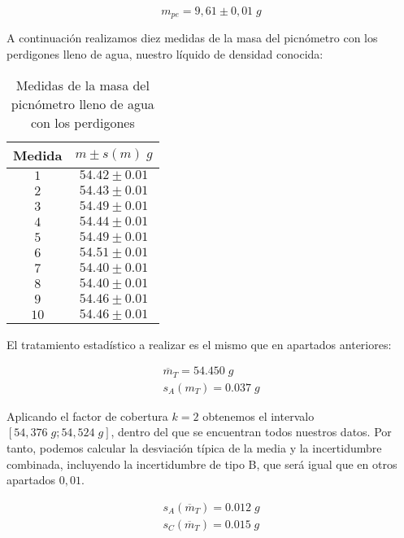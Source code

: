 \documentclass[a4paper,12pt,titlepage]{article}
\begin{document}
\begin{equation}
    m_{pe} = 9,61 \pm 0,01 \; g
\end{equation}

A continuación realizamos diez medidas de la masa del picnómetro con los perdigones lleno de agua, nuestro líquido de densidad conocida:

\begin{table}[h!]
    \centering
    \begin{tabular}{|c|c|}
    \hline
    Medida & $m \pm s(m) \; g$ \\ \hline
    $1$    & $54.42\pm0.01$ \\ \hline
    $2$    & $54.43\pm0.01$ \\ \hline
    $3$    & $54.49\pm0.01$ \\ \hline
    $4$    & $54.44\pm0.01$ \\ \hline
    $5$    & $54.49\pm0.01$ \\ \hline
    $6$    & $54.51\pm0.01$ \\ \hline
    $7$    & $54.40\pm0.01$ \\ \hline
    $8$    & $54.40\pm0.01$ \\ \hline
    $9$    & $54.46\pm0.01$ \\ \hline
    $10$   & $54.46\pm0.01$ \\ \hline
    \end{tabular}
    \caption{Medidas de la masa del picnómetro lleno de agua con los perdigones}
    \label{Masas Perdigones}
    \end{table}

El tratamiento estadístico a realizar es el mismo que en apartados anteriores:

\begin{gather}
    \overline{m}_{T} = 54.450 \; g \\
    s_{A}(m_{T}) = 0.037 \; g
\end{gather}

Aplicando el factor de cobertura $k=2$ obtenemos el intervalo $[54,376 \; g  ; 54,524 \; g]$, dentro del que se encuentran todos nuestros datos. Por tanto, podemos calcular la desviación típica de la media y la incertidumbre combinada, incluyendo la incertidumbre de tipo B, que será igual que en otros apartados $0,01$.

\begin{gather}
    s_{A}(\overline{m}_{T}) = 0.012 \; g \\
    s_{C}(\overline{m}_{T}) = 0.015 \; g
\end{gather}
\end{document}
